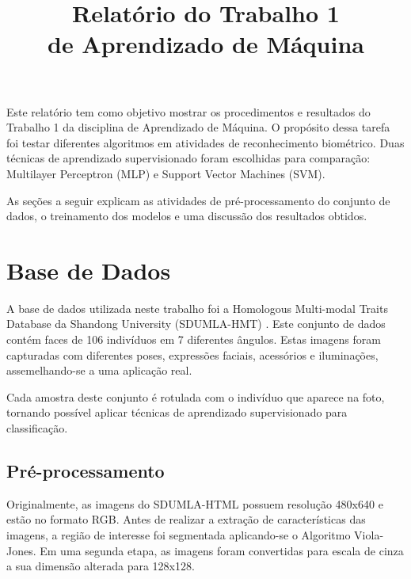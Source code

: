 \documentclass[conference]{IEEEtran}
\begin{document}
\title{Relatório do Trabalho 1\\ de Aprendizado de Máquina}

\author{
}

\maketitle


Este relatório tem como objetivo mostrar os procedimentos e resultados do Trabalho 1 da disciplina de Aprendizado de Máquina. O propósito dessa tarefa foi testar diferentes algoritmos em atividades de reconhecimento biométrico. Duas técnicas de aprendizado supervisionado foram escolhidas para comparação: Multilayer Perceptron (MLP) e Support Vector Machines (SVM).

As seções a seguir explicam as atividades de pré-processamento do conjunto de dados, o treinamento dos modelos e uma discussão dos resultados obtidos.

\section{Base de Dados}
A base de dados utilizada neste trabalho foi a Homologous Multi-modal Traits Database da Shandong University (SDUMLA-HMT) \cite{sdumlahtm}. Este conjunto de dados contém faces de 106 indivíduos em 7 diferentes ângulos. Estas imagens foram capturadas com diferentes poses, expressões faciais, acessórios e iluminações, assemelhando-se a uma aplicação real. 

Cada amostra deste conjunto é rotulada com o indivíduo que aparece na foto, tornando possível aplicar técnicas de aprendizado supervisionado para classificação.

\subsection{Pré-processamento}
Originalmente, as imagens do SDUMLA-HTML possuem resolução 480x640 e estão no formato RGB. Antes de realizar a extração de características das imagens, a região de interesse foi segmentada aplicando-se o Algoritmo Viola-Jones. Em uma segunda etapa, as imagens foram convertidas para escala de cinza a sua dimensão alterada para 128x128.
\end{document}
